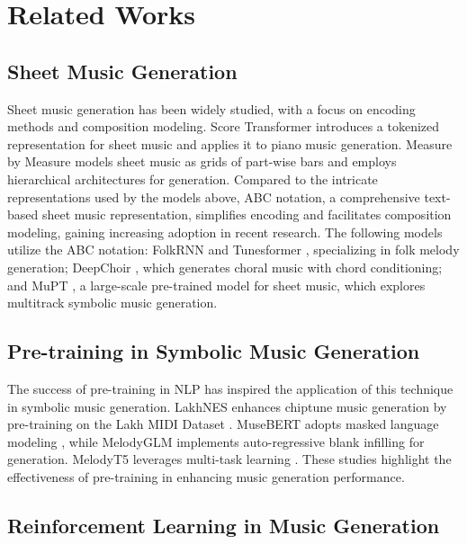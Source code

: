 \section{Related Works}
\subsection{Sheet Music Generation}

Sheet music generation has been widely studied, with a focus on encoding methods and composition modeling. Score Transformer \cite{suzuki2021score} introduces a tokenized representation for sheet music and applies it to piano music generation. Measure by Measure \cite{Yan-2024} models sheet music as grids of part-wise bars and employs hierarchical architectures for generation. Compared to the intricate representations used by the models above, ABC notation, a comprehensive text-based sheet music representation, simplifies encoding and facilitates composition modeling, gaining increasing adoption in recent research. The following models utilize the ABC notation: FolkRNN \cite{sturm2016music} and Tunesformer \cite{wu2023tunesformer}, specializing in folk melody generation; DeepChoir \cite{wu2023chord}, which generates choral music with chord conditioning; and MuPT \cite{qu2024mupt}, a large-scale pre-trained model for sheet music, which explores multitrack symbolic music generation. 

\subsection{Pre-training in Symbolic Music Generation}

The success of pre-training in NLP has inspired the application of this technique in symbolic music generation. LakhNES \cite{donahue2019lakhnes} enhances chiptune music generation by pre-training on the Lakh MIDI Dataset \cite{raffel2016learning}. MuseBERT \cite{wang2021musebert} adopts masked language modeling \cite{kenton2019bert}, while MelodyGLM \cite{wu2023melodyglm} implements auto-regressive blank infilling \cite{du2021glm} for generation. 
MelodyT5 \cite{wu2024melodyt5} leverages multi-task learning \cite{raffel2020exploring}. These studies highlight the effectiveness of pre-training in enhancing music generation performance.

\subsection{Reinforcement Learning in Music Generation}


